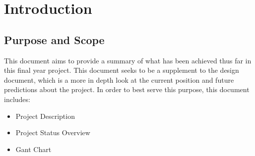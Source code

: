 
\section{Introduction} %



\subsection{Purpose and Scope} %

This document aims to provide a summary of what has been achieved thus far in this final year project. This document seeks to be a supplement to the design document, which is a more in depth look at the current position and future predictions about the project. In order to best serve this purpose, this document includes:

\begin{itemize}
\item Project Description
\item Project Status Overview
\item Gant Chart 
\end{itemize}

